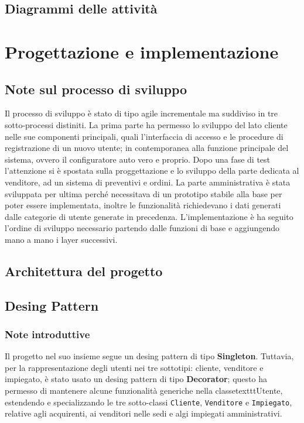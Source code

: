 \documentclass[openany, 12pt]{report}
\begin{document}
\section{Diagrammi delle attivit\`a}


\chapter{Progettazione e implementazione}

\section{Note sul processo di sviluppo}

Il processo di sviluppo è stato di tipo agile incrementale ma suddiviso in tre sotto-processi distiniti. La prima parte ha permesso lo sviluppo del lato cliente nelle sue componenti principali, quali l'interfaccia di accesso e le procedure di registrazione di un nuovo utente; in contemporanea alla funzione principale del sistema, ovvero il configuratore auto vero e proprio. Dopo una fase di test l'attenzione si \`e spostata sulla proggettazione e lo sviluppo della parte dedicata al venditore, ad un sistema di preventivi e ordini.
La parte amministrativa \`e stata sviluppata per ultima perch\'e necessitava di un prototipo stabile alla base per poter essere implementata, inoltre le funzionalit\`a richiedevano i dati generati dalle categorie di utente generate in precedenza.
L'implementazione \`e ha seguito l'ordine di sviluppo necessario partendo dalle funzioni di base e aggiungendo mano a mano i layer successivi.

\section{Architettura del progetto}




\section{Desing Pattern}

\subsection{Note introduttive}

Il progetto nel suo insieme segue un desing pattern di tipo \textbf{Singleton}. Tuttavia, per la rappresentazione degli utenti nei tre sottotipi: cliente, venditore e impiegato, \`e stato usato un desing pattern di tipo \textbf{Decorator}; questo ha permesso di mantenere alcune funzionalit\`a generiche nella classetexttt{Utente}, estendendo e specializzando le tre sotto-classi \texttt{Cliente}, \texttt{Venditore} e \texttt{Impiegato}, relative agli acquirenti, ai venditori nelle sedi e algi impiegati amministrativi.
\end{document}
